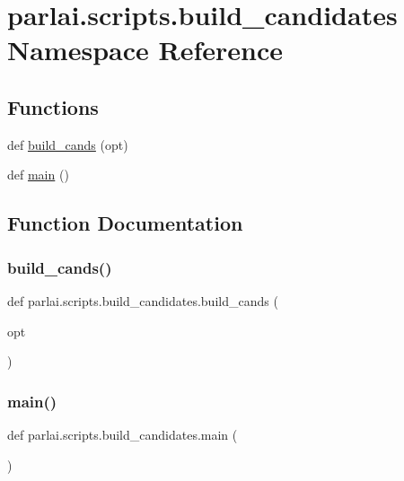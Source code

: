 \hypertarget{namespaceparlai_1_1scripts_1_1build__candidates}{}\section{parlai.\+scripts.\+build\+\_\+candidates Namespace Reference}
\label{namespaceparlai_1_1scripts_1_1build__candidates}
\subsection*{Functions}
\begin{DoxyCompactItemize}
\item 
def \hyperlink{namespaceparlai_1_1scripts_1_1build__candidates_a7932b774b6e77c36347f89f3d79c676e}{build\+\_\+cands} (opt)
\item 
def \hyperlink{namespaceparlai_1_1scripts_1_1build__candidates_a99ffd6743adcd4a6f0f5a26418d21a3a}{main} ()
\end{DoxyCompactItemize}


\subsection{Function Documentation}
\mbox{\label{namespaceparlai_1_1scripts_1_1build__candidates_a7932b774b6e77c36347f89f3d79c676e}} 
\subsubsection{\texorpdfstring{build\+\_\+cands()}{build\_cands()}}
{\footnotesize\ttfamily def parlai.\+scripts.\+build\+\_\+candidates.\+build\+\_\+cands (\begin{DoxyParamCaption}\item[{}]{opt }\end{DoxyParamCaption})}

\mbox{\label{namespaceparlai_1_1scripts_1_1build__candidates_a99ffd6743adcd4a6f0f5a26418d21a3a}} 
\subsubsection{\texorpdfstring{main()}{main()}}
{\footnotesize\ttfamily def parlai.\+scripts.\+build\+\_\+candidates.\+main (\begin{DoxyParamCaption}{ }\end{DoxyParamCaption})}

